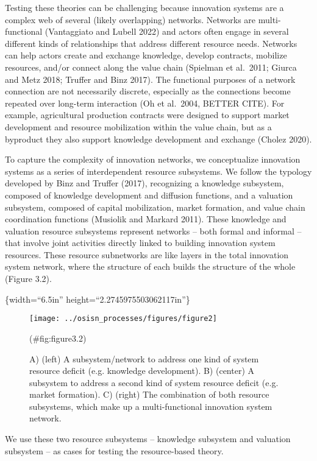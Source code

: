 \documentclass[twoside,12pt,final]{ucthesis-CA2012}
\begin{document}
\begin{ucmainmatter}
Testing these theories can be challenging because innovation systems are
a complex web of several (likely overlapping) networks. Networks are
multi-functional (Vantaggiato and Lubell 2022) and actors often engage
in several different kinds of relationships that address different
resource needs. Networks can help actors create and exchange knowledge,
develop contracts, mobilize resources, and/or connect along the value
chain (Spielman et al.~2011; Giurca and Metz 2018; Truffer and Binz
2017). The functional purposes of a network connection are not
necessarily discrete, especially as the connections become repeated over
long-term interaction (Oh et al.~2004, BETTER CITE). For example,
agricultural production contracts were designed to support market
development and resource mobilization within the value chain, but as a
byproduct they also support knowledge development and exchange (Cholez
2020).

To capture the complexity of innovation networks, we conceptualize
innovation systems as a series of interdependent \textquotesingle resource
subsystems.\textquotesingle{} We follow the typology developed by Binz and Truffer
(2017), recognizing a knowledge subsystem, composed of knowledge
development and diffusion functions, and a valuation subsystem, composed
of capital mobilization, market formation, and value chain coordination
functions (Musiolik and Markard 2011). These knowledge and valuation
resource subsystems represent networks -- both formal and informal --
that involve joint activities directly linked to building innovation
system resources. These resource subnetworks are like layers in the
total innovation system network, where the structure of each builds the
structure of the whole (Figure 3.2).

\{width=``6.5in'' height=``2.2745975503062117in''\}
\begin{figure}

{\centering \texttt{[image: ../osisn\_processes/figures/figure2]} 

}

\caption{A) (left) A subsystem/network to address one kind of system resource deficit (e.g. knowledge development). B) (center) A subsystem to address a second kind of system resource deficit (e.g. market formation). C) (right) The combination of both resource subsystems, which make up a multi-functional innovation system network.}(\#fig:figure3.2)
\end{figure}
We use these two resource subsystems -- knowledge subsystem and
valuation subsystem -- as cases for testing the resource-based theory.


\end{ucmainmatter}
\end{document}
